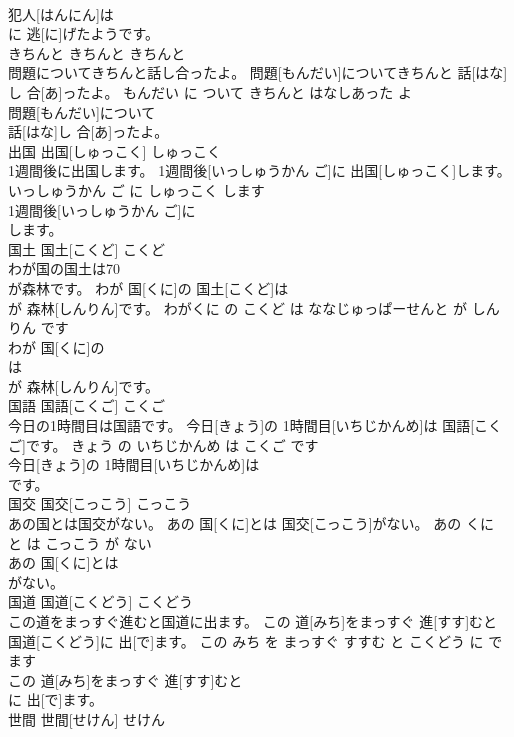 \documentclass[8pt]{extreport}
\begin{document}
\begin{CJK}{UTF8}{min}
\\	犯人[はんにん]は
\\	に 逃[に]げたようです。			
\\	きちんと	きちんと	きちんと	
\\	問題についてきちんと話し合ったよ。	問題[もんだい]についてきちんと 話[はな]し 合[あ]ったよ。	もんだい に ついて きちんと はなしあった よ	
\\	問題[もんだい]について
\\	話[はな]し 合[あ]ったよ。			
\\	出国	出国[しゅっこく]	しゅっこく	
\\	1週間後に出国します。	1週間後[いっしゅうかん ご]に 出国[しゅっこく]します。	いっしゅうかん ご に しゅっこく します	
\\	1週間後[いっしゅうかん ご]に
\\	します。			
\\	国土	国土[こくど]	こくど	
\\	わが国の国土は70
\\	が森林です。	わが 国[くに]の 国土[こくど]は 
\\	[ななじゅっぱーせんと]が 森林[しんりん]です。	わがくに の こくど は ななじゅっぱーせんと が しんりん です	
\\	わが 国[くに]の
\\	は 
\\	[ななじゅっぱーせんと]が 森林[しんりん]です。			
\\	国語	国語[こくご]	こくご	
\\	今日の1時間目は国語です。	今日[きょう]の 1時間目[いちじかんめ]は 国語[こくご]です。	きょう の いちじかんめ は こくご です	
\\	今日[きょう]の 1時間目[いちじかんめ]は
\\	です。			
\\	国交	国交[こっこう]	こっこう	
\\	あの国とは国交がない。	あの 国[くに]とは 国交[こっこう]がない。	あの くに と は こっこう が ない	
\\	あの 国[くに]とは
\\	がない。			
\\	国道	国道[こくどう]	こくどう	
\\	この道をまっすぐ進むと国道に出ます。	この 道[みち]をまっすぐ 進[すす]むと 国道[こくどう]に 出[で]ます。	この みち を まっすぐ すすむ と こくどう に でます	
\\	この 道[みち]をまっすぐ 進[すす]むと
\\	に 出[で]ます。			
\\	世間	世間[せけん]	せけん	

\end{CJK}
\end{document}
